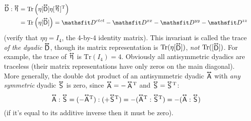 \documentclass[12pt]{article}
\newcommand{\tightoverset}[2]{%
  \mathop{#2}\limits^{\vbox to -.5ex{\kern-0.75ex\hbox{$#1$}\vss}}}
\newcommand{\inlinedy}[1]{\tightoverset{\text{\tiny$\bm\leftrightarrow$}}{#1}}
\newcommand{\capdy}[1]{ \overset{ \text{\tiny$\bm\leftrightarrow$} }{\vphantom{\text{\small{A}}}\smash{#1}} }
\begin{document}
\begin{equation*}
\begin{split}
\capdy{\mathsf{D}} : \inlinedy{\upeta} &= \mathrm{Tr} \left( \eta [\capdy{\mathsf{D}}] \eta [ \mkern1mu \inlinedy{\upeta} \mkern.5mu ]^{\mathrm{T}} \right) \\
&= \mathrm{Tr} \left( \eta [\capdy{\mathsf{D}}] \right) = \mathsfit D^{ct \mkern1.5mu ct} - \mathsfit D^{xx} - \mathsfit D^{yy} - \mathsfit D^{zz}
\end{split}
\end{equation*}
(verify that $\eta \eta = I_4$, the 4-by-4 identity matrix). This invariant is called the trace \emph{of the dyadic} $\inlinedy{\mathsf{D}}$, though its matrix representation is $\mathrm{Tr} (\eta [ \inlinedy{\mathsf{D}} ])$, \emph{not} $\mathrm{Tr} ( [ \inlinedy{\mathsf{D}} ] )$. For example, the trace of $\inlinedy{\upeta}$ is $\mathrm{Tr} (I_4) = 4$. Obviously all antisymmetric dyadics are traceless (their matrix representations have only zeros on the main diagonal). More generally, the double dot product of an antisymmetric dyadic $\inlinedy{\mathsf{A}}$ with \emph{any symmetric} dyadic $\inlinedy{\mathsf{S}}$ is zero, since $\inlinedy{\mathsf{A}} = - \inlinedy{\mathsf{A}} \mkern-2mu ^\mathrm{T}$ and $\inlinedy{\mathsf{S}} = \inlinedy{\mathsf{S}} \mkern-2mu^\mathrm{T}$:
\begin{equation*}
\capdy{\mathsf{A}} : \capdy{\mathsf{S}} = ( - \capdy{\mathsf{A}} \mkern0mu ^\mathrm{T} ) : ( + \capdy{\mathsf{S}} \mkern0mu ^\mathrm{T} ) = - ( \capdy{\mathsf{A}} \mkern0mu ^\mathrm{T} : \capdy{\mathsf{S}} \mkern0mu ^\mathrm{T} ) = - ( \capdy{\mathsf{A}} : \capdy{\mathsf{S}} )
\end{equation*}
(if it's equal to its additive inverse then it must be zero).
\end{document}
